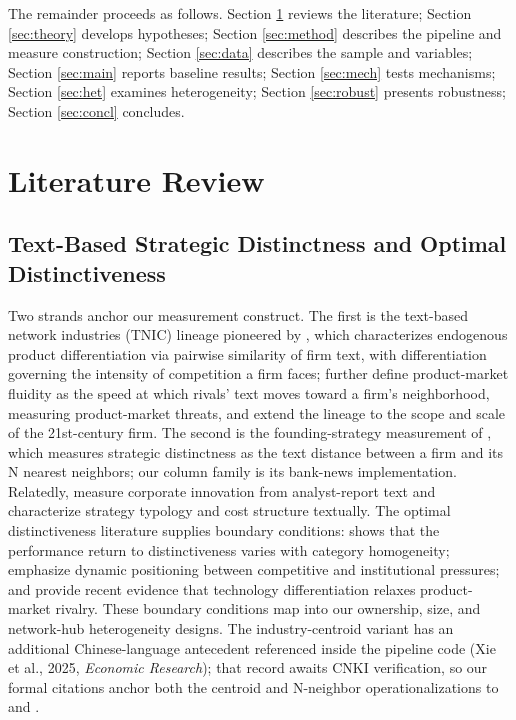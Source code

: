The remainder proceeds as follows. Section \ref{sec:lit} reviews the
literature; Section \ref{sec:theory} develops hypotheses; Section
\ref{sec:method} describes the pipeline and measure construction;
Section \ref{sec:data} describes the sample and variables; Section
\ref{sec:main} reports baseline results; Section \ref{sec:mech} tests
mechanisms; Section \ref{sec:het} examines heterogeneity; Section
\ref{sec:robust} presents robustness; Section \ref{sec:concl}
concludes.

\section{Literature Review}\label{sec:lit}

\subsection{Text-Based Strategic Distinctness and Optimal Distinctiveness}
Two strands anchor our measurement construct. The first is the
text-based network industries (TNIC) lineage pioneered by
\textcite{hoberg2016tnic}, which characterizes endogenous product
differentiation via pairwise similarity of firm text, with
differentiation governing the intensity of competition a firm faces;
\textcite{hoberg2014fluidity} further define product-market fluidity
as the speed at which rivals' text moves toward a firm's
neighborhood, measuring product-market threats, and
\textcite{hoberg2025scope} extend the lineage to the scope and scale
of the 21st-century firm. The second is the founding-strategy
measurement of \textcite{guzman2023strategy}, which measures
strategic distinctness as the text distance between a firm and its N
nearest neighbors; our  column family is
its bank-news implementation. Relatedly,
\textcite{bellstam2021innovation} measure corporate innovation from
analyst-report text and \textcite{banker2024strategy} characterize
strategy typology and cost structure textually. The optimal
distinctiveness literature supplies boundary conditions:
\textcite{haans2019distinctiveness} shows that the performance return
to distinctiveness varies with category homogeneity;
\textcite{su2024optimal} emphasize dynamic positioning between
competitive and institutional pressures; and
\textcite{arts2025technology} provide recent evidence that technology
differentiation relaxes product-market rivalry. These boundary
conditions map into our ownership, size, and network-hub
heterogeneity designs. The industry-centroid variant has an
additional Chinese-language antecedent referenced inside the pipeline
code (Xie et al., 2025, \emph{Economic Research}); that record awaits
CNKI verification, so our formal citations anchor both the centroid
and N-neighbor operationalizations to \textcite{hoberg2016tnic} and
\textcite{guzman2023strategy}.

